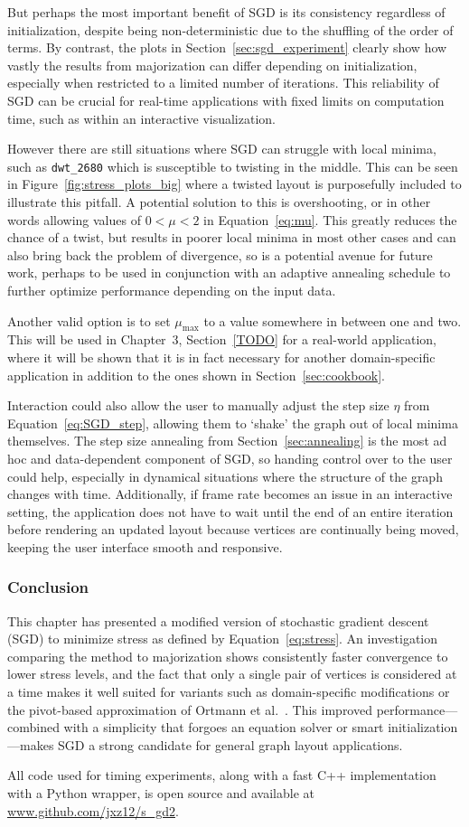 But perhaps the most important benefit of SGD is its consistency regardless of initialization, despite being non-deterministic due to the shuffling of the order of terms. By contrast, the plots in Section~\ref{sec:sgd_experiment} clearly show how vastly the results from majorization can differ depending on initialization, especially when restricted to a limited number of iterations. This reliability of SGD can be crucial for real-time applications with fixed limits on computation time, such as within an interactive visualization.

However there are still situations where SGD can struggle with local minima, such as \texttt{dwt\_2680} which is susceptible to twisting in the middle. This can be seen in Figure~\ref{fig:stress_plots_big} where a twisted layout is purposefully included to illustrate this pitfall.
A potential solution to this is overshooting, or in other words allowing values of $0 < \mu < 2$ in Equation~\eqref{eq:mu}. This greatly reduces the chance of a twist, but results in poorer local minima in most other cases and can also bring back the problem of divergence, so is a potential avenue for future work,
perhaps to be used in conjunction with an adaptive annealing schedule to further optimize performance depending on the input data.

Another valid option is to set $\mu_{\max}$ to a value somewhere in between one and two. This will be used in Chapter~3, Section~\ref{TODO} for a real-world application, where it will be shown that it is in fact necessary for another domain-specific application in addition to the ones shown in Section~\ref{sec:cookbook}.

Interaction could also allow the user to manually adjust the step size $\eta$ from Equation~\eqref{eq:SGD_step}, allowing them to `shake' the graph out of local minima themselves. The step size annealing from Section~\ref{sec:annealing} is the most ad hoc and data-dependent component of SGD, so handing control over to the user could help, especially in dynamical situations where the structure of the graph changes with time.
Additionally, if frame rate becomes an issue in an interactive setting, the application does not have to wait until the end of an entire iteration before rendering an updated layout because vertices are continually being moved, keeping the user interface smooth and responsive.

\subsubsection{Conclusion}
This chapter has presented a modified version of stochastic gradient descent (SGD) to minimize stress as defined by Equation~\eqref{eq:stress}. An investigation comparing the method to majorization shows consistently faster convergence to lower stress levels, and the fact that only a single pair of vertices is considered at a time makes it well suited for variants such as domain-specific modifications or the pivot-based approximation of Ortmann et al.\ \cite{Ortmann2017}.
This improved performance---combined with a simplicity that forgoes an equation solver or smart initialization---makes
SGD a strong candidate for general graph layout applications.

All code used for timing experiments, along with a fast C++ implementation with a Python wrapper, is open source and available at \url{www.github.com/jxz12/s_gd2}.